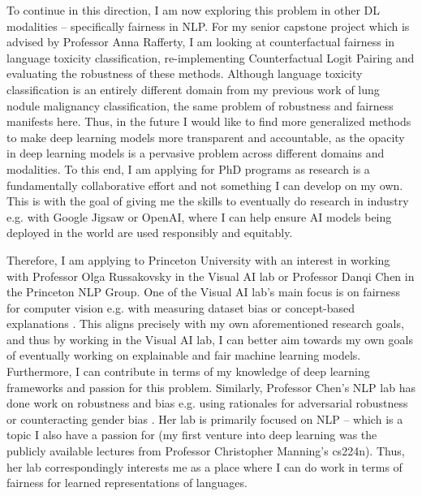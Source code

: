 \documentclass[10pt]{article}
\begin{document}
To continue in this direction, I am now exploring this problem in other DL modalities -- specifically fairness in NLP. For my senior capstone project which is advised by Professor Anna Rafferty, I am looking at counterfactual fairness in language toxicity classification, re-implementing Counterfactual Logit Pairing \cite{garg2019counterfactual} and evaluating the robustness of these methods. Although language toxicity classification is an entirely different domain from my previous work of lung nodule malignancy classification, the same problem of robustness and fairness manifests here. Thus, in the future I would like to find more generalized methods to make deep learning models more transparent and accountable, 
as the opacity in deep learning models is a pervasive problem across different domains and modalities.
To this end, I am applying for PhD programs as research is a fundamentally collaborative effort and not something I can develop on my own.
This is with the goal of giving me the skills to eventually do research in industry e.g. with Google Jigsaw or OpenAI, where I can help ensure AI models being deployed in the world are used responsibly and equitably.

Therefore, I am applying to Princeton University with an interest in working with Professor Olga Russakovsky in the Visual AI lab or Professor Danqi Chen in the Princeton NLP Group. One of the Visual AI lab's main focus is on fairness for computer vision e.g. with measuring dataset bias \cite{wang2022revise} or concept-based explanations \cite{ramaswamy2022overlooked}.
This aligns precisely with my own aforementioned research goals, and thus by working in the Visual AI lab, I can better aim towards my own goals of eventually working on explainable and fair machine learning models. Furthermore, I can contribute in terms of my knowledge of deep learning frameworks and passion for this problem.
Similarly, Professor Chen's NLP lab has done work on robustness and bias e.g. using rationales for adversarial robustness \cite{chen2022can} or counteracting gender bias \cite{he2022mabel}. Her lab is primarily focused on NLP -- which is a topic I also have a passion for (my first venture into deep learning was the publicly available lectures from Professor Christopher Manning's cs224n). Thus, her lab correspondingly interests me as a place where I can do work in terms of fairness for learned representations of languages.
\end{document}
